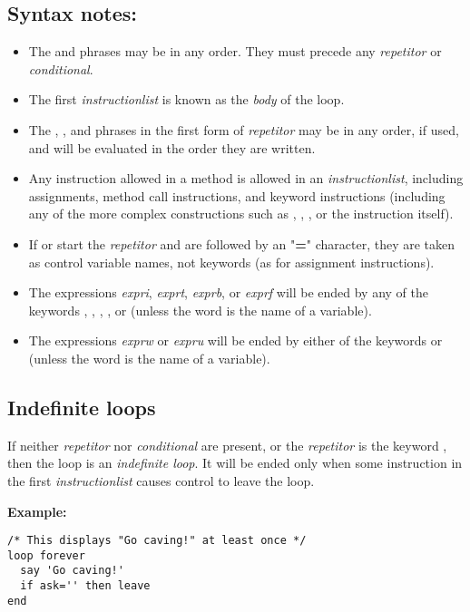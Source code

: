 \subsection{Syntax notes:}
\begin{itemize}
\item 
The  and  phrases may be in any order.
They must precede any \emph{repetitor} or \emph{conditional}.
\item 
{}
The first \emph{instructionlist} is known as the \emph{body} of
the loop.
\item 
The , , and  phrases in the first form
of \emph{repetitor} may be in any order, if used, and will be
evaluated in the order they are written.
\item 
Any instruction allowed in a method is allowed in an
\emph{instructionlist}, including assignments, method call
instructions, and keyword instructions (including any of the more
complex constructions such as , , ,
or the  instruction itself).
\item 
If  or  start the \emph{repetitor} and
are followed by an "\textbf{=}" character, they are taken as
control variable names, not keywords (as for assignment instructions).
\item 
The expressions \emph{expri}, \emph{exprt}, \emph{exprb}, or
\emph{exprf} will be ended by any of the keywords ,
, , , or  (unless
the word is the name of a variable).
\item 
The expressions \emph{exprw} or \emph{expru} will be ended by
either of the keywords  or  (unless the
word is the name of a variable).
\end{itemize}
\subsection{Indefinite loops}
 If neither \emph{repetitor} nor \emph{conditional} are
present, or the \emph{repetitor} is the keyword ,
then the loop is an \emph{indefinite loop}.
It will be ended only when some instruction in the first
\emph{instructionlist} causes control to leave the loop.

\textbf{Example:}
\begin{lstlisting}
/* This displays "Go caving!" at least once */
loop forever
  say 'Go caving!'
  if ask='' then leave
end
\end{lstlisting}
